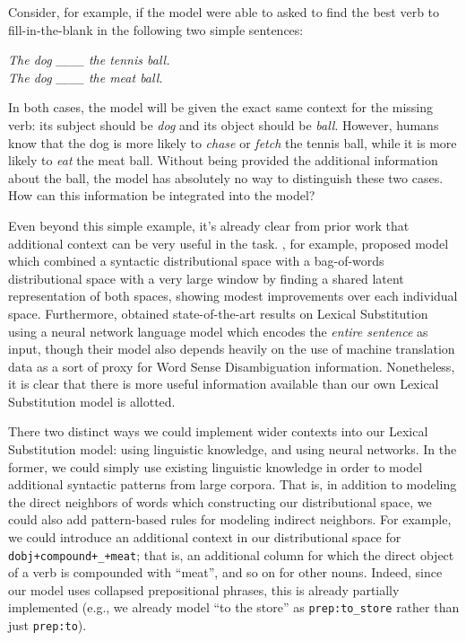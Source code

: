\documentclass[12pt]{article}
\begin{document}
Consider, for example, if the model were able to asked to find the best verb
to fill-in-the-blank in the following two simple sentences:

\begin{center}
  {\em The dog \_\_\_ the tennis ball.}\\
  {\em The dog \_\_\_ the meat ball.}
\end{center}

In both cases, the model will be given the exact same context for the missing
verb: its subject should be {\em dog} and its object should be {\em ball}. However,
humans know that the dog is more likely to {\em chase} or {\em fetch} the tennis
ball, while it is more likely to {\em eat} the meat ball. Without being provided
the additional information about the ball, the model has absolutely no way
to distinguish these two cases. How can this information be integrated into the
model?

Even beyond this simple example, it's already clear from prior work that
additional context can be very useful in the task.
, for example, proposed model which combined
a syntactic distributional space with a bag-of-words distributional space with
a very large window by finding a shared latent representation of both spaces,
showing modest improvements over each individual space. Furthermore,
 obtained state-of-the-art results on Lexical
Substitution using a neural network language model which encodes the {\em
entire sentence} as input, though their model also depends heavily on the use
of machine translation data as a sort of proxy for Word Sense Disambiguation
information. Nonetheless, it is clear that there is more useful information
available than our own Lexical Substitution model is allotted.

There two distinct ways we could implement wider contexts into our Lexical
Substitution model: using linguistic knowledge, and using neural networks.
In the former, we could simply use existing linguistic knowledge in order to
model additional syntactic patterns from large corpora. That is, in
addition to modeling the direct neighbors of words which constructing our
distributional space, we could also add pattern-based rules for modeling
indirect neighbors. For example, we could introduce an additional context
in our distributional space for {\tt dobj+compound+\_+meat}; that is, an
additional column for which the direct object of a verb is compounded with
``meat'', and so on for other nouns. Indeed, since our model uses collapsed
prepositional phrases, this is already partially implemented (e.g., we already
model ``to the store'' as {\tt prep:to\_store} rather than just {\tt prep:to}).
\end{document}
